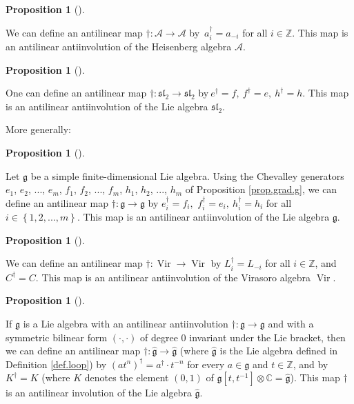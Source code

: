 \documentclass
[numbers=enddot,12pt,final,onecolumn,german,notitlepage]{scrartcl}%
\theoremstyle{definition}
\newtheorem{prop}[theo]{Proposition}
\newenvironment{proposition}[1][]
{\begin{prop}[#1]\begin{leftbar}}
{\end{leftbar}\end{prop}}
\begin{document}
\begin{proposition}
We can define an antilinear map $\dag:\mathcal{A}\rightarrow\mathcal{A}$
by\ $a_{i}^{\dag}=a_{-i}$ for all $i\in\mathbb{Z}$. This map is an antilinear
antiinvolution of the Heisenberg algebra $\mathcal{A}$.
\end{proposition}

\begin{proposition}
One can define an antilinear map $\dag:\mathfrak{sl}_{2}\rightarrow
\mathfrak{sl}_{2}$ by$\ e^{\dag}=f,\ f^{\dag}=e,\ h^{\dag}=h$. This map is an
antilinear antiinvolution of the Lie algebra $\mathfrak{sl}_{2}$.
\end{proposition}

More generally:

\begin{proposition}
Let $\mathfrak{g}$ be a simple finite-dimensional Lie algebra. Using the
Chevalley generators $e_{1}$, $e_{2}$, $...$, $e_{m}$, $f_{1}$, $f_{2}$,
$...$, $f_{m}$, $h_{1}$, $h_{2}$, $...$, $h_{m}$ of Proposition
\ref{prop.grad.g}, we can define an antilinear map $\dag:\mathfrak{g}%
\rightarrow\mathfrak{g}$ by $e_{i}^{\dag}=f_{i},$ $f_{i}^{\dag}=e_{i}%
,\ h_{i}^{\dag}=h_{i}$ for all $i\in\left\{  1,2,...,m\right\}  $. This map is
an antilinear antiinvolution of the Lie algebra $\mathfrak{g}$.
\end{proposition}

\begin{proposition}
We can define an antilinear map $\dag:\operatorname*{Vir}\rightarrow
\operatorname*{Vir}$ by $L_{i}^{\dag}=L_{-i}$ for all $i\in\mathbb{Z}$, and
$C^{\dag}=C$. This map is an antilinear antiinvolution of the Virasoro algebra
$\operatorname*{Vir}$.
\end{proposition}

\begin{proposition}
If $\mathfrak{g}$ is a Lie algebra with an antilinear antiinvolution
$\dag:\mathfrak{g}\rightarrow\mathfrak{g}$ and with a symmetric bilinear form
$\left(  \cdot,\cdot\right)  $ of degree $0$ invariant under the Lie bracket,
then we can define an antilinear map $\dag:\widehat{\mathfrak{g}}%
\rightarrow\widehat{\mathfrak{g}}$ (where $\widehat{\mathfrak{g}}$ is the Lie
algebra defined in Definition \ref{def.loop}) by $\left(  at^{n}\right)
^{\dag}=a^{\dag}\cdot t^{-n}$ for every $a\in\mathfrak{g}$ and $t\in
\mathbb{Z}$, and by $K^{\dag}=K$ (where $K$ denotes the element $\left(
0,1\right)  $ of $\mathfrak{g}\left[  t,t^{-1}\right]  \otimes\mathbb{C}%
=\widehat{\mathfrak{g}}$). This map $\dag$ is an antilinear involution of the
Lie algebra $\widehat{\mathfrak{g}}$.
\end{proposition}
\end{document}
